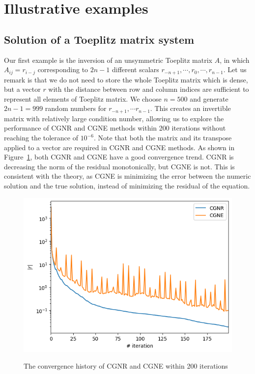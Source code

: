 \documentclass[10pt]{article}
\begin{document}
\section{Illustrative examples}

\subsection{Solution of a Toeplitz matrix system}

Our first example is the inversion of an unsymmetric Toeplitz matrix $A$, in which $A_{ij}=r_{i-j}$ corresponding to $2n-1$ different scalars $r_{-n+1},\cdots,r_0,\cdots, r_{n-1}$. Let us remark is that  we  do not need to store the whole Toeplitz matrix which is dense, but a vector $r$ with the distance between row and column indices are sufficient to represent all elements of Toeplitz matrix.
We choose $n=500$ and generate $2n-1=999$ random numbers for $r_{-n+1},\cdots r_{n-1}$. This creates an invertible matrix with relatively large condition number, allowing us to explore the performance of CGNR and CGNE methods within 200 iterations without reaching the tolerance of $10^{-6}$. Note that both the matrix and its transpose applied to a vector are required in CGNR and CGNE methods. As shown in Figure~\ref{fig:cgnrcgne}, both CGNR and CGNE have a good convergence trend. CGNR is decreasing the norm of the residual monotonically, but CGNE is not. This is consistent with the theory, as CGNE is minimizing the error between the numeric solution and the true solution, instead of minimizing the residual of the equation. 

\begin{figure}
  \centering
  \includegraphics[width=0.7\linewidth]{cgnr_cgne.png}\label{fig:cgnrcgne}
  \caption{The convergence history of CGNR and CGNE within 200 iterations}
\end{figure}
\end{document}
